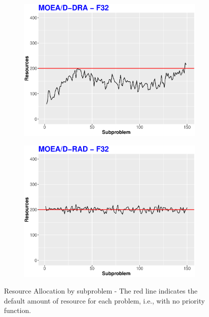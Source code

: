 \begin{figure}[!t]
	\centering
	\begin{subfigure}[b]{0.33\textwidth}
		\centering
		\includegraphics[width=1\textwidth, height=0.8\textwidth]{img/RA-DRA-32.eps}
	\end{subfigure}
	\begin{subfigure}[b]{0.33\textwidth}
		\centering
		\includegraphics[width=1\textwidth, height=0.8\textwidth]{img/RA-RAD-32.eps}
	\end{subfigure}
	\caption{Resource Allocation by subproblem - The red line indicates the default amount of resource for each problem, i.e., with no priority function.}
	\label{RAs2}
\end{figure}

